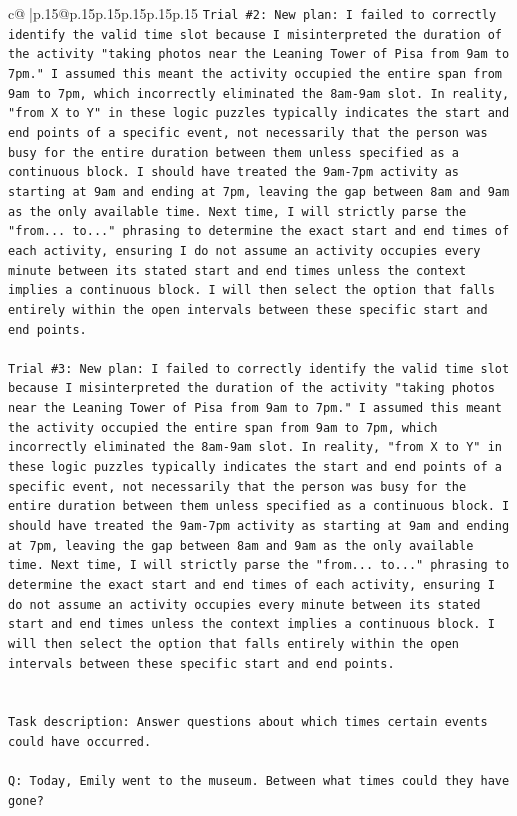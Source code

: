 \documentclass{article}
\begin{document}
{\begin{supertabular}{c@{$\;$}|p{.15\linewidth}@{}p{.15\linewidth}p{.15\linewidth}p{.15\linewidth}p{.15\linewidth}p{.15\linewidth}}
{{{\texttt{Trial \#2: New plan: I failed to correctly identify the valid time slot because I misinterpreted the duration of the activity "taking photos near the Leaning Tower of Pisa from 9am to 7pm." I assumed this meant the activity occupied the entire span from 9am to 7pm, which incorrectly eliminated the 8am{-}9am slot. In reality, "from X to Y" in these logic puzzles typically indicates the start and end points of a specific event, not necessarily that the person was busy for the entire duration between them unless specified as a continuous block. I should have treated the 9am{-}7pm activity as starting at 9am and ending at 7pm, leaving the gap between 8am and 9am as the only available time. Next time, I will strictly parse the "from... to..." phrasing to determine the exact start and end times of each activity, ensuring I do not assume an activity occupies every minute between its stated start and end times unless the context implies a continuous block. I will then select the option that falls entirely within the open intervals between these specific start and end points.} \\
\\ 
\texttt{Trial \#3: New plan: I failed to correctly identify the valid time slot because I misinterpreted the duration of the activity "taking photos near the Leaning Tower of Pisa from 9am to 7pm." I assumed this meant the activity occupied the entire span from 9am to 7pm, which incorrectly eliminated the 8am{-}9am slot. In reality, "from X to Y" in these logic puzzles typically indicates the start and end points of a specific event, not necessarily that the person was busy for the entire duration between them unless specified as a continuous block. I should have treated the 9am{-}7pm activity as starting at 9am and ending at 7pm, leaving the gap between 8am and 9am as the only available time. Next time, I will strictly parse the "from... to..." phrasing to determine the exact start and end times of each activity, ensuring I do not assume an activity occupies every minute between its stated start and end times unless the context implies a continuous block. I will then select the option that falls entirely within the open intervals between these specific start and end points.} \\
\\ 
\\ 
\texttt{Task description: Answer questions about which times certain events could have occurred.} \\
\\ 
\texttt{Q: Today, Emily went to the museum. Between what times could they have gone?} \\
}}}
\end{supertabular}}
\end{document}
